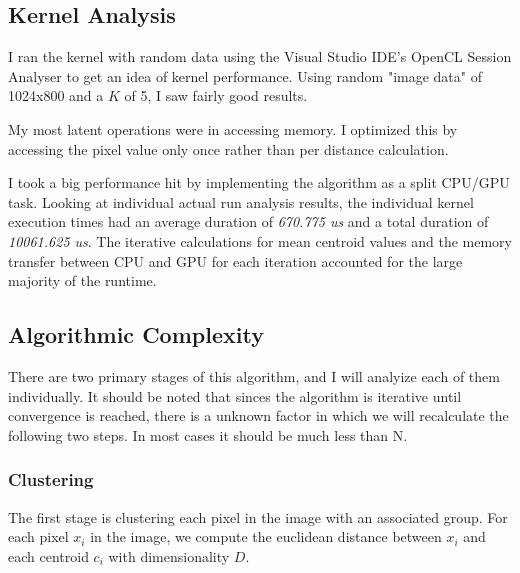 \documentclass[11pt]{article}
\begin{document}
\subsection{Kernel Analysis}

I ran the kernel with random data using the Visual Studio IDE's OpenCL Session Analyser to get
an idea of kernel performance. Using random "image data" of 1024x800 and a $K$ of 5, I saw 
fairly good results. 


My most latent operations were in accessing memory. I optimized this by accessing the pixel value
only once rather than per distance calculation.

I took a big performance hit by implementing the algorithm as a split CPU/GPU task. Looking
at individual actual run analysis results, the individual kernel execution times had an average
duration of \emph{670.775 us} and a total duration of \emph{10061.625 us}. The iterative 
calculations for mean centroid values and the memory transfer between CPU and GPU for each 
iteration accounted for the large majority of the runtime. 

\subsection{Algorithmic Complexity}

There are two primary stages of this algorithm, and I will analyize each of them individually.
It should be noted that sinces the algorithm is iterative until convergence is reached, there
is a unknown factor in which we will recalculate the following two steps. In most cases it
should be much less than N.

\subsubsection{Clustering}

The first stage is clustering each pixel in the image with an associated group. For
each pixel $x_i$ in the image, we compute the euclidean distance between $x_i$
and each centroid $c_i$ with dimensionality $D$.
\end{document}
